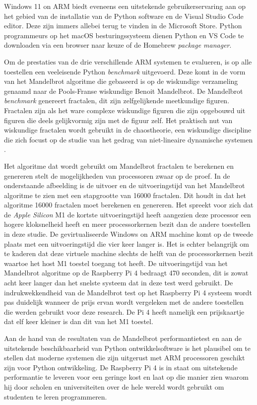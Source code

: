 Windows 11 on ARM biedt eveneens een uitstekende gebruikerservaring aan op het gebied van de installatie van de Python software en de Visual Studio Code editor. Deze zijn immers allebei terug te vinden in de Microsoft Store. Python programmeurs op het macOS besturingssysteem dienen Python en VS Code te downloaden via een browser naar keuze of de Homebrew \textit{package manager}.

Om de prestaties van de drie verschillende ARM systemen te evalueren, is op alle toestellen een veeleisende Python \textit{benchmark} uitgevoerd. Deze komt in de vorm van het Mandelbrot algoritme die gebaseerd is op de wiskundige verzameling genaamd naar de Pools-Franse wiskundige Benoit Mandelbrot. De Mandelbrot \textit{benchmark} genereert fractalen, dit zijn zelfgelijkende meetkundige figuren. Fractalen zijn als het ware complexe wiskundige figuren die zijn opgebouwd uit figuren die deels gelijkvormig zijn met de figuur zelf. Het praktisch nut van wiskundige fractalen wordt gebruikt in de chaostheorie, een wiskundige discipline die zich focust op de studie van het gedrag van niet-lineaire dynamische systemen \autocite{Mandelbrot1980}.

Het algoritme dat wordt gebruikt om Mandelbrot fractalen te berekenen en genereren stelt de mogelijkheden van processoren zwaar op de proef. In de onderstaande afbeelding is de uitvoer en de uitvoeringstijd van het Mandelbrot algoritme te zien met een stapgrootte van 16000 fractalen. Dit houdt in dat het algoritme 16000 fractalen moet berekenen en genereren. Het spreekt voor zich dat de \textit{Apple Silicon} M1 de kortste uitvoeringstijd heeft aangezien deze processor een hogere kloksnelheid heeft en meer processorkernen bezit dan de andere toestellen in deze studie. De gevirtualiseerde Windows on ARM machine komt op de tweede plaats met een uitvoeringstijd die vier keer langer is. Het is echter belangrijk om te kaderen dat deze virtuele machine slechts de helft van de processorkernen bezit waartoe het host M1 toestel toegang tot heeft. De uitvoeringstijd van het Mandelbrot algoritme op de Raspberry Pi 4 bedraagt 470 seconden, dit is zowat acht keer langer dan het snelste systeem dat in deze test werd gebruikt. De indrukwekkendheid van de Mandelbrot test op het Raspberry Pi 4 systeem wordt pas duidelijk wanneer de prijs ervan wordt vergeleken met de andere toestellen die werden gebruikt voor deze research. De Pi 4 heeft namelijk een prijskaartje dat elf keer kleiner is dan dit van het M1 toestel.

Aan de hand van de resultaten van de Mandelbrot performantietest en aan de uitstekende beschikbaarheid van Python ontwikkelsoftware is het plausibel om te stellen dat moderne systemen die zijn uitgerust met ARM processoren geschikt zijn voor Python ontwikkeling. De Raspberry Pi 4 is in staat om uitstekende performantie te leveren voor een geringe kost en laat op die manier zien waarom hij door scholen en universiteiten over de hele wereld wordt gebruikt om studenten te leren programmeren.

